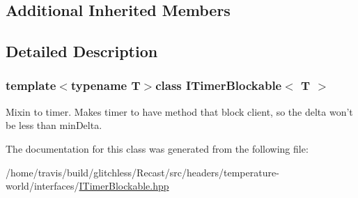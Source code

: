 \subsection*{Additional Inherited Members}


\subsection{Detailed Description}
\subsubsection*{template$<$typename T$>$class I\-Timer\-Blockable$<$ T $>$}

Mixin to timer. Makes timer to have method that block client, so the {\ttfamily delta} won't be less than {\ttfamily min\-Delta}. 

The documentation for this class was generated from the following file\-:\begin{DoxyCompactItemize}
\item 
/home/travis/build/glitchless/\-Recast/src/headers/temperature-\/world/interfaces/\hyperlink{_i_timer_blockable_8hpp}{I\-Timer\-Blockable.\-hpp}\end{DoxyCompactItemize}
